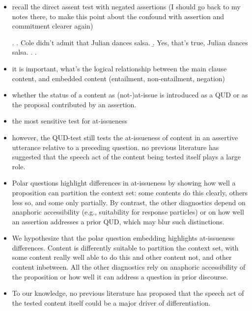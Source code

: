 \documentclass[times,linguex,xcolor]{glossa}
\begin{document}
\begin{itemize}
\begin{itemize}
        \item recall the direct assent test with negated assertions (I should go back to my notes there, to make this point about the confound with assertion and commitment clearer again)

        \ex. \a. Cole didn't admit that Julian dances salsa.
          \b. Yes, that's true, Julian dances salsa.
          \z.
        \z. 

        \item it is important, what's the logical relationship between the main clause content, and embedded content (entailment, non-entailment, negation)

      \end{itemize}

    \end{itemize}

    \begin{itemize}
        \item  whether the status of a content as (not-)at-issue is introduced as a QUD or as the proposal contributed by an assertion.
        \item the most sensitive test for at-issueness
        \item however, the QUD-test still tests the at-issueness of content in an assertive utterance relative to a preceding question. no previous literature has suggested that the speech act of the content being tested itself plays a large role.
        \item Polar questions highlight differences in at-issueness by showing how well a proposition can partition the context set: some contents do this clearly, others less so, and some only partially. By contrast, the other diagnostics depend on anaphoric accessibility (e.g., suitability for response particles) or on how well an assertion addresses a prior QUD, which may blur such distinctions.

        \item We hypothesize that the polar question embedding highlights at-issueness differences. Content is differently suitable to partition the context set, with some content really well able to do this and other content not, and other content inbetween. All the other diagnostics rely on anaphoric accessibility of the proposition or how well it can address a question in prior discourse.

        \item To our knowledge, no previous literature has proposed that the speech act of the tested content itself could be a major driver of differentiation.

      \end{itemize}
\end{document}
